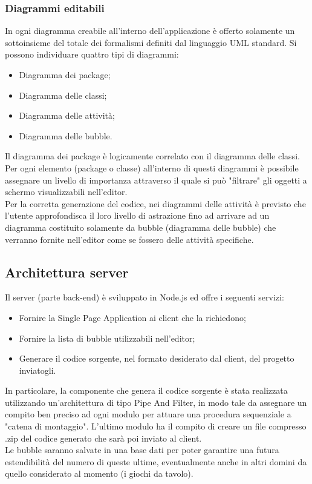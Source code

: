 \documentclass[../PianoDiQualifica.tex]{subfiles}
\begin{document}
			\subsubsection{Diagrammi editabili}
				In ogni diagramma creabile all'interno dell'applicazione è offerto solamente un
				sottoinsieme del totale dei formalismi definiti dal linguaggio UML standard.
				Si possono individuare quattro tipi di diagrammi:
				\begin{itemize}
					\item Diagramma dei package;
					\item Diagramma delle classi;
					\item Diagramma delle attività;
					\item Diagramma delle bubble.
				\end{itemize}
				Il diagramma dei package è logicamente correlato con il diagramma delle classi. Per ogni
				elemento (package o classe) all'interno di questi diagrammi è possibile assegnare un
				livello di importanza attraverso il quale si può "filtrare" gli oggetti a schermo
				visualizzabili nell'editor.\\
				Per la corretta generazione del codice, nei diagrammi delle attività è previsto che
				l'utente approfondisca il loro livello di astrazione fino ad arrivare ad un diagramma
				costituito solamente da bubble (diagramma delle bubble) che verranno fornite nell'editor
				come se fossero delle attività specifiche.
		\subsection{Architettura server}
			Il server (parte back-end) è sviluppato in Node.js ed offre i seguenti servizi:
			\begin{itemize}
				\item Fornire la Single Page Application ai client che la richiedono;
				\item Fornire la lista di bubble utilizzabili nell'editor;
				\item Generare il codice sorgente, nel formato desiderato dal client, del progetto
				inviatogli.
			\end{itemize}
			In particolare, la componente che genera il codice sorgente è stata realizzata utilizzando
			un'architettura di tipo Pipe And Filter, in modo tale da assegnare un compito ben preciso
			ad ogni modulo per attuare una procedura sequenziale a "catena di montaggio". L'ultimo
			modulo ha il compito di creare un file compresso .zip del codice generato che sarà poi
			inviato al client.\\
			Le bubble saranno salvate in una base dati per poter garantire una futura estendibilità del
			numero di queste ultime, eventualmente anche in altri domini da quello considerato al
			momento (i giochi da tavolo).
\end{document}
